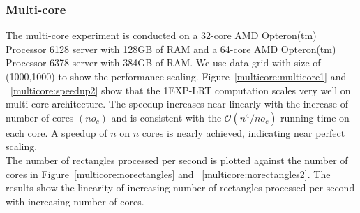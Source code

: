 \documentclass[AMA,LATO1COL]{WileyNJD-v2-bak}
\newcommand\bigo{\mathcal O}
\begin{document}
\subsubsection{Multi-core}
 The multi-core experiment is conducted on a 32-core AMD Opteron(tm) Processor 6128 server with 128GB of RAM and a 64-core AMD Opteron(tm) Processor 6378 server with 384GB of RAM. We use data grid with size of (1000,1000) to show the performance scaling. Figure~\ref{multicore:multicore1} and ~\ref{multicore:speedup2} show that the 1EXP-LRT computation scales very well on multi-core architecture.  The speedup increases near-linearly with the increase of number of cores $(no_c)$ and is consistent with the $\bigo(n^4/no_c)$ running time on each core. A speedup of $n$ on $n$ cores is nearly achieved, indicating near perfect scaling.\\
The number of rectangles processed per second is plotted against the number of cores in Figure~\ref{multicore:norectangles} and ~\ref{multicore:norectangles2}. The results show the linearity of increasing number of rectangles processed per second with increasing number of cores.
\end{document}
